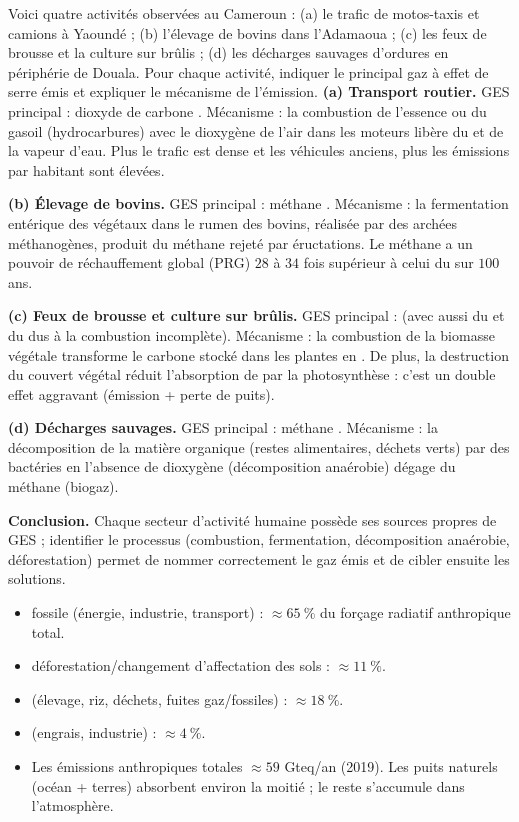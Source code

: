\documentclass[11pt]{article}
\newcommand{\cle}[1]{{\popxbold\color{popdark}#1}}
\begin{document}
\begin{exoresolu}
Voici quatre activités observées au Cameroun : (a) le trafic de motos-taxis et camions à Yaoundé ; (b) l'élevage de bovins dans l'Adamaoua ; (c) les feux de brousse et la culture sur brûlis ; (d) les décharges sauvages d'ordures en périphérie de Douala.
Pour chaque activité, indiquer le principal gaz à effet de serre émis et expliquer le mécanisme de l'émission.
\tcblower
\textbf{(a) Transport routier.} GES principal : dioxyde de carbone . Mécanisme : la combustion de l'essence ou du gasoil (hydrocarbures) avec le dioxygène de l'air dans les moteurs libère du  et de la vapeur d'eau. Plus le trafic est dense et les véhicules anciens, plus les émissions par habitant sont élevées.

\textbf{(b) Élevage de bovins.} GES principal : méthane . Mécanisme : la \cle{fermentation entérique} des végétaux dans le rumen des bovins, réalisée par des archées méthanogènes, produit du méthane rejeté par éructations. Le méthane a un pouvoir de réchauffement global (PRG) $28$ à $34$ fois supérieur à celui du  sur $100$ ans.

\textbf{(c) Feux de brousse et culture sur brûlis.} GES principal :  (avec aussi du  et du  dus à la combustion incomplète). Mécanisme : la combustion de la biomasse végétale transforme le carbone stocké dans les plantes en . De plus, la destruction du couvert végétal réduit l'absorption de  par la \cle{photosynthèse} : c'est un double effet aggravant (émission + perte de puits).

\textbf{(d) Décharges sauvages.} GES principal : méthane . Mécanisme : la décomposition de la matière organique (restes alimentaires, déchets verts) par des bactéries en l'absence de dioxygène (\cle{décomposition anaérobie}) dégage du méthane (biogaz).

\textbf{Conclusion.} Chaque secteur d'activité humaine possède ses sources propres de GES ; identifier le processus (combustion, fermentation, décomposition anaérobie, déforestation) permet de nommer correctement le gaz émis et de cibler ensuite les solutions.
\end{exoresolu}

\begin{aretenir}
\begin{itemize}
\item {} fossile (énergie, industrie, transport) : $\approx 65\ \%$ du forçage radiatif anthropique total.
\item {} déforestation/changement d'affectation des sols : $\approx 11\ \%$.
\item {} (élevage, riz, déchets, fuites gaz/fossiles) : $\approx 18\ \%$.
\item {} (engrais, industrie) : $\approx 4\ \%$.
\item Les émissions anthropiques totales $\approx 59$ Gteq/an (2019). Les puits naturels (océan + terres) absorbent environ la moitié ; le reste s'accumule dans l'atmosphère.
\end{itemize}
\end{aretenir}
\end{document}
